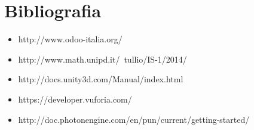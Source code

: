 
\section{Bibliografia}

\begin{itemize}
	\item http://www.odoo-italia.org/
	\item http://www.math.unipd.it/~tullio/IS-1/2014/
	\item http://docs.unity3d.com/Manual/index.html 
	\item https://developer.vuforia.com/
	\item http://doc.photonengine.com/en/pun/current/getting-started/
\end{itemize}
